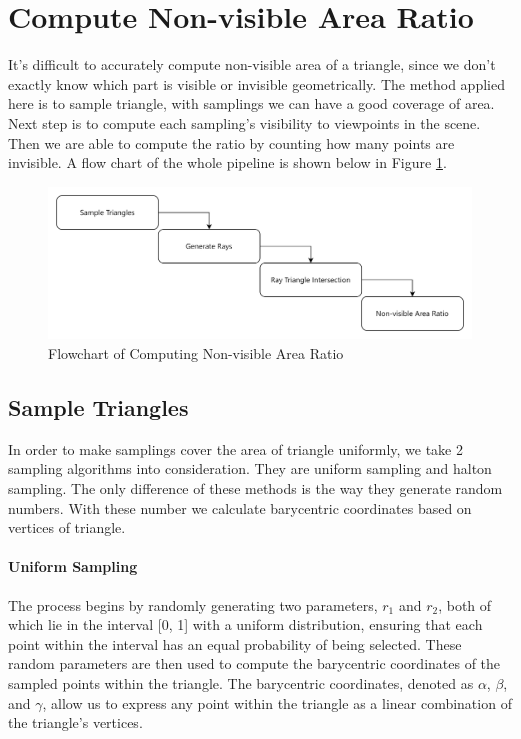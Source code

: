 \documentclass[11pt, a4paper,oneside,chapterprefix=false]{scrbook}
\begin{document}
\section{Compute Non-visible Area Ratio} \label{sec:compute non-visible area ratio}

It's difficult to accurately compute non-visible area of a triangle, since we don't exactly know which part is visible or invisible geometrically. The method applied here is to sample triangle, with samplings we can have a good coverage of area. Next step is to compute each sampling's visibility to viewpoints in the scene. Then we are able to compute the ratio by counting how many points are invisible. A flow chart of the whole pipeline is shown below in Figure \ref{fig:flowchart of computing non-visible area ratio}.

\begin{figure}[H]
    \centering
    \includegraphics*[width=1.0\textwidth]{figures/Compute Non-visible Area Ratio.png}
    \caption{Flowchart of Computing Non-visible Area Ratio}
    \label{fig:flowchart of computing non-visible area ratio}
\end{figure}

\subsection{Sample Triangles} \label{subsec:sample triangle}

In order to make samplings cover the area of triangle uniformly, we take 2 sampling algorithms into consideration. They are uniform sampling and halton sampling. The only difference of these methods is the way they generate random numbers. With these number we calculate barycentric coordinates based on vertices of triangle. 

\paragraph{Uniform Sampling}

The process begins by randomly generating two parameters, \( r_1 \) and \( r_2 \), both of which lie in the interval [0, 1] with a uniform distribution, ensuring that each point within the interval has an equal probability of being selected. These random parameters are then used to compute the barycentric coordinates of the sampled points within the triangle. The barycentric coordinates, denoted as \( \alpha \), \( \beta \), and \( \gamma \), allow us to express any point within the triangle as a linear combination of the triangle's vertices.
\end{document}
